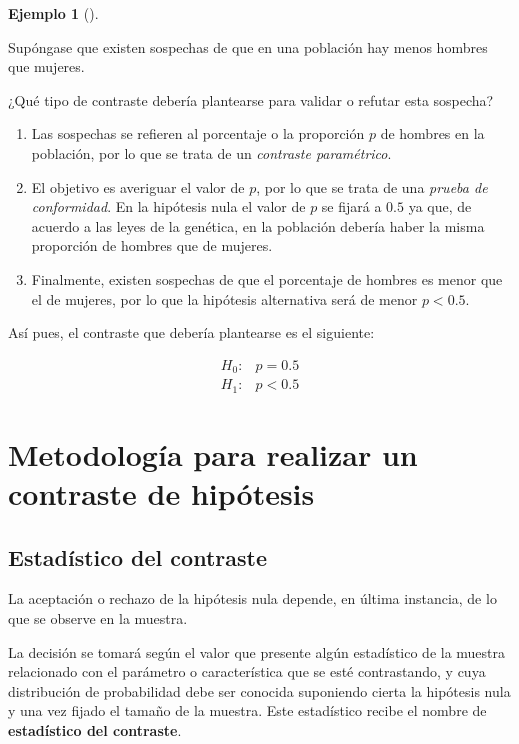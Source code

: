 \documentclass[
  spanish,
  a4paper,
]{scrreport}
\theoremstyle{plain}
\theoremstyle{definition}
\newtheorem{example}{Ejemplo}[chapter]
\theoremstyle{definition}
\theoremstyle{remark}
\begin{document}
\begin{example}[]\protect\hypertarget{exm-eleccion-tipo-contraste}{}\label{exm-eleccion-tipo-contraste}

Supóngase que existen sospechas de que en una población hay menos
hombres que mujeres.

¿Qué tipo de contraste debería plantearse para validar o refutar esta
sospecha?

\begin{enumerate}
\def\labelenumi{\arabic{enumi}.}
\item
  Las sospechas se refieren al porcentaje o la proporción \(p\) de
  hombres en la población, por lo que se trata de un \emph{contraste
  paramétrico}.
\item
  El objetivo es averiguar el valor de \(p\), por lo que se trata de una
  \emph{prueba de conformidad}. En la hipótesis nula el valor de \(p\)
  se fijará a \(0.5\) ya que, de acuerdo a las leyes de la genética, en
  la población debería haber la misma proporción de hombres que de
  mujeres.
\item
  Finalmente, existen sospechas de que el porcentaje de hombres es menor
  que el de mujeres, por lo que la hipótesis alternativa será de menor
  \(p<0.5\).
\end{enumerate}

Así pues, el contraste que debería plantearse es el siguiente:

\begin{align*}
H_0: & p=0.5 \\
H_1: & p<0.5
\end{align*}

\end{example}

\section{Metodología para realizar un contraste de
hipótesis}\label{metodologuxeda-para-realizar-un-contraste-de-hipuxf3tesis}

\subsection{Estadístico del
contraste}\label{estaduxedstico-del-contraste}

La aceptación o rechazo de la hipótesis nula depende, en última
instancia, de lo que se observe en la muestra.

La decisión se tomará según el valor que presente algún estadístico de
la muestra relacionado con el parámetro o característica que se esté
contrastando, y cuya distribución de probabilidad debe ser conocida
suponiendo cierta la hipótesis nula y una vez fijado el tamaño de la
muestra. Este estadístico recibe el nombre de \textbf{estadístico del
contraste}.
\end{document}
